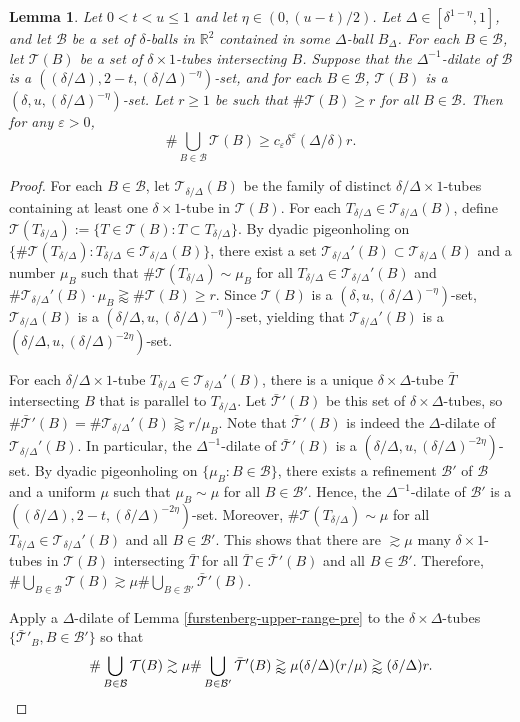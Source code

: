 \documentclass{amsart}
\numberwithin{equation}{section}
\newtheorem{lemma}[theorem]{Lemma}
\newcommand{\de}{\delta}
\newcommand{\De}{\Delta}
\newcommand{\e}{\varepsilon}
\newcommand{\cb}{\mathcal B}
\newcommand{\ZR}{\mathbb{R}}
\newcommand{\cT}{{\mathcal T}}
\begin{document}
\begin{lemma}
\label{furstenberg-upper-range}
Let $0<t<u\leq 1$ and let $\eta\in(0,(u-t)/2)$. 
Let $\De\in[\de^{1-\eta},1]$, and let $\cb$ be a set of $\de$-balls in $\ZR^2$ contained in some   $\De$-ball $B_\De$.
For each $B\in\cb$, let $\cT(B)$ be a set of $\de\times1$-tubes intersecting $B$.
Suppose that the $\De^{-1}$-dilate of $\cb$ is a $((\de/\De),2-t,(\de/\De)^{-\eta})$-set,
and for each $B\in\cb$, $\cT(B)$ is a $(\de,u,(\de/\De)^{-\eta})$-set.
Let $r\geq1$ be such that $\#\cT(B)\geq r$ for all $B\in\cb$.
Then for any $\e>0$, 
\begin{equation}
    \#\bigcup_{B\in\cb}\cT(B)\geq c_\e\de^\e (\De/\de)r.
\end{equation}
\end{lemma}
\begin{proof}
For each $B\in\cb$, let $\cT_{\de/\De}(B)$ be the family of distinct $\de/\De\times1$-tubes containing at least one $\de\times1$-tube in $\cT(B)$.
For each $T_{\de/\De}\in\cT_{\de/\De}(B)$, define $\cT(T_{\de/\De}):=\{T\in\cT(B):T\subset T_{\de/\De}\}$.
By dyadic pigeonholing on $\{\#\cT(T_{\de/\De}):T_{\de/\De}\in\cT_{\de/\De}(B)\}$, there exist a set $\cT_{\de/\De}'(B)\subset\cT_{\de/\De}(B)$ and a number $\mu_{B}$ such that $\#\cT(T_{\de/\De})\sim\mu_B$ for all $T_{\de/\De}\in\cT_{\de/\De}'(B)$ and $\#\cT_{{\de/\De}}'(B)\cdot\mu_B\gtrapprox\#\cT(B)\geq r$.
Since $\cT(B)$ is a $(\de,u, (\de/\De)^{-\eta})$-set, $\cT_{\de/\De}(B)$ is a $(\de/\De, u, (\de/\De)^{-\eta})$-set, yielding that $\cT_{\de/\De}'(B)$ is a $(\de/\De,u,(\de/\De)^{-2\eta})$-set.

For each $\de/\De\times1$-tube $T_{\de/\De}\in\cT_{\de/\De}'(B)$, there is a unique $\de\times \De$-tube $\bar T$ intersecting $B$ that is parallel to $T_{\de/\De}$.
Let $\bar\cT'(B)$ be this set of $\de\times\De$-tubes,
so $\#\bar\cT'(B)=\#\cT_{{\de/\De}}'(B)\gtrapprox r/\mu_B$.
Note that $\bar\cT'(B)$ is indeed the $\De$-dilate of $\cT_{\de/\De}'(B)$. 
In particular, the $\De^{-1}$-dilate of $\bar\cT'(B)$ is a $(\de/\De,u,(\de/\De)^{-2\eta})$-set.
By dyadic pigeonholing on $\{\mu_B:B\in\cb\}$, there exists a refinement $\cb'$ of $\cb$ and a uniform $\mu$ such that $\mu_B\sim\mu$ for all $B\in\cb'$.
Hence, the $\De^{-1}$-dilate of $\cb'$ is a $((\de/\De),2-t,(\de/\De)^{-2\eta})$-set.
Moreover, $\#\cT(T_{\de/\De})\sim\mu$ for all $T_{\de/\De}\in\cT_{\de/\De}'(B)$ and all $B\in\cb'$. 
This shows that there are $\gtrsim \mu$ many $\de\times 1$-tubes in $\cT(B)$ intersecting $\bar T$ for all $\bar T\in\bar\cT'(B)$ and all $B\in\cb'$.
Therefore, $\#\bigcup_{B\in\cb}\cT(B)\gtrsim\mu \#\bigcup_{B\in\cb'}\bar\cT'(B)$.



Apply a $\De$-dilate of Lemma \ref{furstenberg-upper-range-pre} to the $\de\times\De$-tubes $\{\bar \cT'_B,B\in\cb'\}$ so that
\begin{equation}
    \#\bigcup_{B\in\cb}\cT(B)\gtrsim\mu \#\bigcup_{B\in\cb'}\bar\cT'(B)\gtrapprox \mu(\de/\De) (r/\mu)\gtrapprox (\de/\De)r. \qedhere
\end{equation}


\end{proof}
\end{document}
